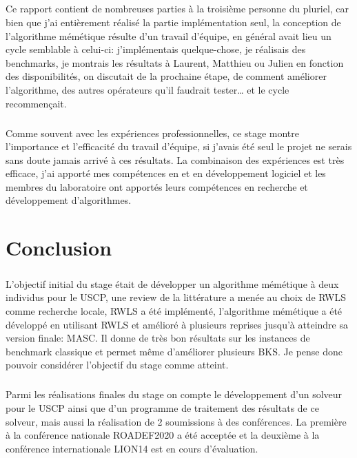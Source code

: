 \documentclass[a4paper,11pt,twoside,french,report]{../common/simplem}
\begin{document}
			\paragraph*{}
				Ce rapport contient de nombreuses parties à la troisième personne du pluriel, car bien que j'ai entièrement réalisé la partie implémentation seul, la conception de l'algorithme mémétique résulte d'un travail d'équipe, en général avait lieu un cycle semblable à celui-ci: j'implémentais quelque-chose, je réalisais des benchmarks, je montrais les résultats à Laurent, Matthieu ou Julien en fonction des disponibilités, on discutait de la prochaine étape, de comment améliorer l'algorithme, des autres opérateurs qu'il faudrait tester\ldots{} et le cycle recommençait.
			\paragraph*{}
				Comme souvent avec les expériences professionnelles, ce stage montre l'importance et l'efficacité du travail d'équipe, si j'avais été seul le projet ne serais sans doute jamais arrivé à ces résultats. La combinaison des expériences est très efficace, j'ai apporté mes compétences en \Cpp{} et en développement logiciel et les membres du laboratoire ont apportés leurs compétences en recherche et développement d'algorithmes.
	\chapter*{Conclusion}
		\paragraph*{}
			L'objectif initial du stage était de développer un algorithme mémétique à deux individus pour le \gls{USCP}, une review de la littérature a menée au choix de \gls{RWLS} comme recherche locale, \gls{RWLS} a été implémenté, l'algorithme mémétique a été développé en utilisant \gls{RWLS} et amélioré à plusieurs reprises jusqu'à atteindre sa version finale: \gls{MASC}. Il donne de très bon résultats sur les instances de benchmark classique et permet même d'améliorer plusieurs \gls{BKS}. Je pense donc pouvoir considérer l'objectif du stage comme atteint.
		\paragraph*{}
			Parmi les réalisations finales du stage on compte le développement d'un solveur pour le \gls{USCP} ainsi que d'un programme de traitement des résultats de ce solveur, mais aussi la réalisation de 2 soumissions à des conférences. La première à la conférence nationale \acrshort{ROADEF2020} a été acceptée et la deuxième à la conférence internationale \acrshort{LION14} est en cours d'évaluation.
\end{document}
